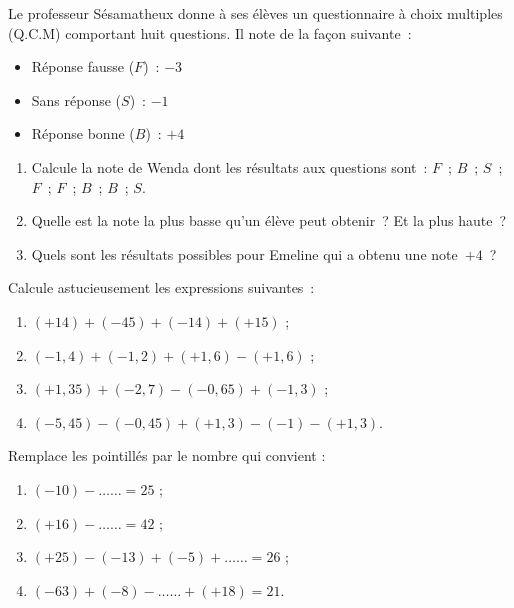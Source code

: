 \begin{exercice}
Le professeur Sésamatheux donne à ses élèves un questionnaire à choix multiples (Q.C.M) comportant huit questions. Il note de la façon suivante :
\begin{itemize}
 \item Réponse fausse ($F$) : $-3$
 \item Sans réponse ($S$) : $-1$
 \item Réponse bonne ($B$) : $+4$
 \end{itemize}
 \vspace{-0.4em}
 \begin{enumerate}
 \item Calcule la note de Wenda dont les résultats aux questions sont : $F$ ; $B$ ; $S$ ; $F$ ; $F$ ; $B$ ; $B$ ; $S$. 
 \item Quelle est la note la plus basse qu'un élève peut obtenir ? Et la plus haute ?
 \item Quels sont les résultats possibles pour Emeline qui a obtenu une note $+4$ ?
 \end{enumerate}
\end{exercice}


\begin{exercice}
Calcule astucieusement les expressions suivantes :
\begin{enumerate}
 \item $(+14) + (-45) + (-14) + (+15)$ ;
 \item $(-1,4) + (-1,2) + (+1,6) - (+1,6)$ ;
 \item $(+1,35) + (-2,7) - (-0,65) + (-1,3)$ ;
 \item $(-5,45) - (-0,45) + (+1,3) - (-1) - (+1,3)$.
 \end{enumerate}
\end{exercice}


\begin{exercice}
Remplace les pointillés par le nombre qui convient :
\begin{enumerate}
 \item $(-10) - \ldots \ldots  = 25$ ;
 \item $(+16) - \ldots \ldots  = 42$ ;
 \item $(+25) - (-13) + (-5) + \ldots \ldots = 26$ ;
 \item $(-63) + (-8) - \ldots \ldots + (+18) = 21$.
 \end{enumerate}
\end{exercice}


